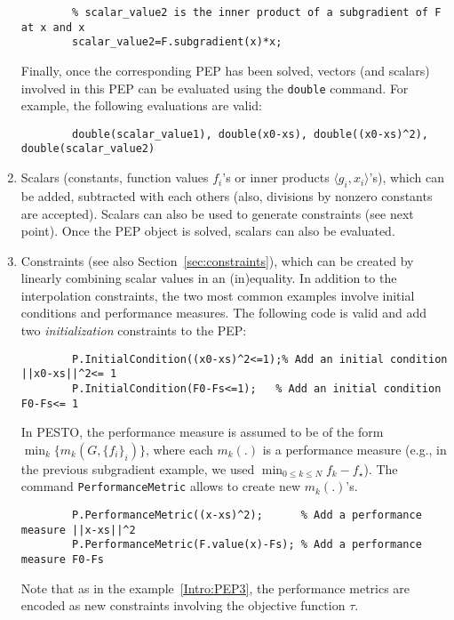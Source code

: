 \documentclass[11pt,a4paper]{article}
\newcommand{\inner}[2]{{\langle #1, #2\rangle}}
\begin{document}
\begin{enumerate}
\begin{lstlisting}
		% scalar_value2 is the inner product of a subgradient of F at x and x
		scalar_value2=F.subgradient(x)*x; 
		\end{lstlisting}
		Finally, once the corresponding PEP has been solved, vectors (and scalars) involved in this PEP can be evaluated using the \verb?double? command. For example, the following evaluations are valid:\\[-1cm]
		\begin{lstlisting}
		double(scalar_value1), double(x0-xs), double((x0-xs)^2), double(scalar_value2)
		\end{lstlisting}
		\item Scalars (constants, function values $f_i$'s or inner products $\inner{g_i}{x_i}$'s), which can be added, subtracted with each others (also, divisions by nonzero constants are accepted). Scalars can also be used to generate constraints (see next point). Once the PEP object is solved, scalars can also be evaluated.
		\item Constraints (see also Section~\ref{sec:constraints}), which can be created by linearly combining scalar values in an (in)equality. In addition to the interpolation constraints, the two most common examples involve initial conditions and performance measures. The following code is valid and add two \emph{initialization} constraints to the PEP:\\[-1cm]
		\begin{lstlisting}
		P.InitialCondition((x0-xs)^2<=1);% Add an initial condition ||x0-xs||^2<= 1
		P.InitialCondition(F0-Fs<=1);	% Add an initial condition F0-Fs<= 1
		\end{lstlisting}
		In PESTO, the performance measure is assumed to be of the form $\min_k \{m_k(G,\{f_i\}_i)\}$, where each $m_k(.)$ is a performance measure (e.g., in the previous subgradient example, we used $\min_{0\leq k \leq N} f_k-f_\star$). The command \verb?PerformanceMetric? allows to create new $m_k(.)$'s.\\[-1cm]
		\begin{lstlisting}
		P.PerformanceMetric((x-xs)^2); 		% Add a performance measure ||x-xs||^2
		P.PerformanceMetric(F.value(x)-Fs);	% Add a performance measure F0-Fs
		\end{lstlisting}
		Note that as in the example~\eqref{Intro:PEP3}, the performance metrics are encoded as new constraints involving the objective function $\tau$. 
	\end{enumerate}
	\newpage
\end{document}
